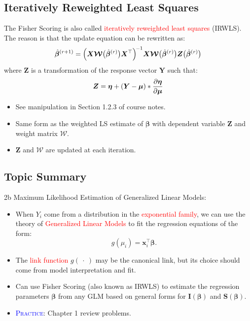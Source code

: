 \documentclass{article}\usepackage[]{graphicx}\usepackage[svgnames]{xcolor}
\providecommand{\RandomVector}[1]{\bm{#1}}%
\providecommand{\Vector}[1]{\bm{#1}}%
\providecommand{\Matrix}[1]{\bm{#1}}
\providecommand{\MatrixCal}[1]{\bm{\mathcal{#1}}}
\begin{document}
\subsection*{Iteratively Reweighted Least Squares}
The Fisher Scoring is also called \textcolor{Red}{iteratively reweighted least squares} (IRWLS).
The reason is that the update equation can be rewritten as:
\[ \hat{\Vector{\beta}}^{(r+1)}=\Bigl(\Matrix{X}\MatrixCal{W}\bigl(\hat{\Vector{\beta}}^{(r)}\bigr)\Matrix{X}^\top\Bigr)^{\!-1}\Matrix{X}\MatrixCal{W}\bigl(\hat{\Vector{\beta}}^{(r)}\bigr)\RandomVector{Z}\bigl(\hat{\Vector{\beta}}^{(r)}\bigr) \]
where $ \RandomVector{Z} $ is a transformation of the response vector $ \RandomVector{Y} $ such that:
\[ \RandomVector{Z}=\Vector{\eta}+(\RandomVector{Y}-\Vector{\mu})\ast\pdv{\Vector{\eta}}{\Vector{\mu}} \]
\begin{itemize}
    \item See manipulation in Section 1.2.3 of course notes.
    \item Same form as the weighted LS estimate of $ \Vector{\beta} $ with dependent variable $ \RandomVector{Z} $
          and weight matrix $ \MatrixCal{W} $.
    \item $ \RandomVector{Z} $ and $ \MatrixCal{W} $ are updated at each iteration.
\end{itemize}
\subsection*{Topic Summary}
2b Maximum Likelihood Estimation of Generalized Linear Models:
\begin{itemize}
    \item When $ Y_i $ come from a distribution in the \textcolor{Red}{exponential family}, we can use
          the theory of \textcolor{Red}{Generalized Linear Models} to fit the regression equations of
          the form:
          \[ g(\mu_i)=\Vector{x}_i^\top \Vector{\beta}. \]
    \item The \textcolor{Red}{link function} $ g(\:\cdot\:) $ may be the canonical link, but its choice should
          come from model interpretation and fit.
    \item Can use Fisher Scoring (also known as IRWLS) to estimate the regression parameters $ \Vector{\beta} $ from any GLM based on general forms for $ \Matrix{I}(\Vector{\beta}) $
          and $ \Vector{S}(\Vector{\beta}) $.
    \item \textcolor{Blue}{\textsc{Practice}}: Chapter 1 review problems.
\end{itemize}
\end{document}
